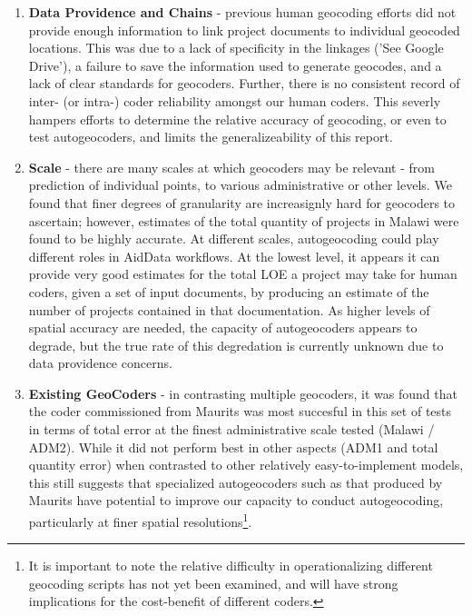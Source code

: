 \documentclass[10pt]{article}
\begin{document}
\begin{enumerate}
\item \textbf{Data Providence and Chains} - previous human geocoding efforts did not provide enough information to link project documents to individual geocoded locations. This was due to a lack of specificity in the linkages ('See Google Drive'), a failure to save the information used to generate geocodes, and a lack of clear standards for geocoders.  Further, there is no consistent record of inter- (or intra-) coder reliability amongst our human coders. This severly hampers efforts to determine the relative accuracy of geocoding, or even to test autogeocoders, and limits the generalizeability of this report.
\item \textbf{Scale} - there are many scales at which geocoders may be relevant - from prediction of individual points, to various administrative or other levels.  We found that finer degrees of granularity are increasignly hard for geocoders to ascertain; however, estimates of the total quantity of projects in Malawi were found to be highly accurate. At different scales, autogeocoding could play different roles in AidData workflows.  At the lowest level, it appears it can provide very good estimates for the total LOE a project may take for human coders, given a set of input documents, by producing an estimate of the number of projects contained in that documentation.  As higher levels of spatial accuracy are needed, the capacity of autogeocoders appears to degrade, but the true rate of this degredation is currently unknown due to data providence concerns. 
\item \textbf{Existing GeoCoders} - in contrasting multiple geocoders, it was found that the coder commissioned from Maurits was most succesful in this set of tests in terms of total error at the finest administrative scale tested (Malawi / ADM2).  While it did not perform best in other aspects (ADM1 and total quantity error) when contrasted to other relatively easy-to-implement models, this still suggests that specialized autogeocoders such as that produced by Maurits have potential to improve our capacity to conduct autogeocoding, particularly at finer spatial resolutions\footnote{It is important to note the relative difficulty in operationalizing different geocoding scripts has not yet been examined, and will have strong implications for the cost-benefit of different coders.}.
\end{enumerate}
\end{document}
